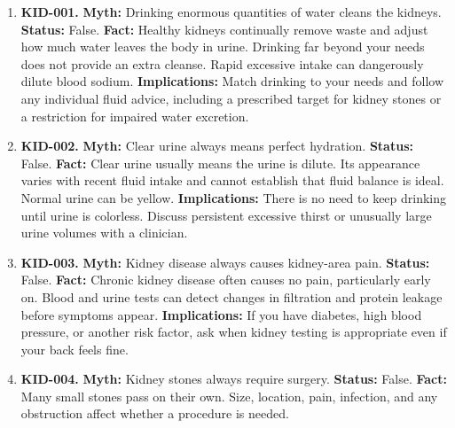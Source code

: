 \documentclass[11pt,oneside]{book}
\begin{document}
\begin{enumerate}[leftmargin=0pt,labelwidth=0pt,labelsep=0pt,itemindent=0pt]
\section{Kidney, Nutrition, Cardiovascular, Eye, Breast, Sexual, and First-Aid Myths}
\item[] \textbf{KID-001.} \textbf{Myth:} Drinking enormous quantities of water cleans the kidneys.\newline
\textbf{Status:} False.\newline
\textbf{Fact:} Healthy kidneys continually remove waste and adjust how much water leaves the body in urine. Drinking far beyond your needs does not provide an extra cleanse. Rapid excessive intake can dangerously dilute blood sodium. \cite{ref292,ref267,ref268}\newline
\textbf{Implications:} Match drinking to your needs and follow any individual fluid advice, including a prescribed target for kidney stones or a restriction for impaired water excretion.
\item[] \textbf{KID-002.} \textbf{Myth:} Clear urine always means perfect hydration.\newline
\textbf{Status:} False.\newline
\textbf{Fact:} Clear urine usually means the urine is dilute. Its appearance varies with recent fluid intake and cannot establish that fluid balance is ideal. Normal urine can be yellow. \cite{ref292}\newline
\textbf{Implications:} There is no need to keep drinking until urine is colorless. Discuss persistent excessive thirst or unusually large urine volumes with a clinician.
\item[] \textbf{KID-003.} \textbf{Myth:} Kidney disease always causes kidney-area pain.\newline
\textbf{Status:} False.\newline
\textbf{Fact:} Chronic kidney disease often causes no pain, particularly early on. Blood and urine tests can detect changes in filtration and protein leakage before symptoms appear. \cite{ref267}\newline
\textbf{Implications:} If you have diabetes, high blood pressure, or another risk factor, ask when kidney testing is appropriate even if your back feels fine.
\item[] \textbf{KID-004.} \textbf{Myth:} Kidney stones always require surgery.\newline
\textbf{Status:} False.\newline
\textbf{Fact:} Many small stones pass on their own. Size, location, pain, infection, and any obstruction affect whether a procedure is needed. \cite{ref183}\newline

\end{enumerate}
\end{document}
